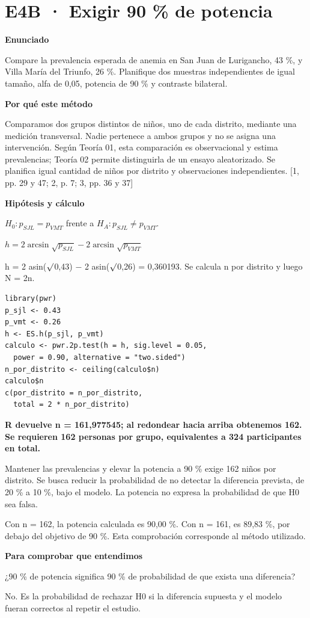 \documentclass[10pt,a4paper]{article}
\newcommand{\etiqueta}[1]{\par{\bfseries\color{Blue}#1}\par}
\newcommand{\cajares}[1]{\par\colorbox{Pale}{\parbox{\dimexpr\linewidth-2\fboxsep}{\vspace{4pt}\textbf{\color{Navy}#1}\vspace{4pt}}}\par}
\begin{document}
\section*{E4B · Exigir 90 \% de potencia}
\etiqueta{Enunciado}
Compare la prevalencia esperada de anemia en San Juan de Lurigancho, 43 \%, y Villa María del Triunfo, 26 \%. Planifique dos muestras independientes de igual tamaño, alfa de 0,05, potencia de 90 \% y contraste bilateral.
\etiqueta{Por qué este método}
Comparamos dos grupos distintos de niños, uno de cada distrito, mediante una medición transversal. Nadie pertenece a ambos grupos y no se asigna una intervención. Según Teoría 01, esta comparación es observacional y estima prevalencias; Teoría 02 permite distinguirla de un ensayo aleatorizado. Se planifica igual cantidad de niños por distrito y observaciones independientes. [1, pp. 29 y 47; 2, p. 7; 3, pp. 36 y 37]
\etiqueta{Hipótesis y cálculo}
$H_0:p_{SJL}=p_{VMT}$ frente a $H_A:p_{SJL}\ne p_{VMT}$.

$h=2\arcsin\sqrt{p_{SJL}}-2\arcsin\sqrt{p_{VMT}}$

h = 2 asin(\ensuremath{\surd}0,43) \ensuremath{-} 2 asin(\ensuremath{\surd}0,26) = 0,360193. Se calcula n por distrito y luego N = 2n.
\begin{Verbatim}
library(pwr)
p_sjl <- 0.43
p_vmt <- 0.26
h <- ES.h(p_sjl, p_vmt)
calculo <- pwr.2p.test(h = h, sig.level = 0.05,
  power = 0.90, alternative = "two.sided")
n_por_distrito <- ceiling(calculo$n)
calculo$n
c(por_distrito = n_por_distrito,
  total = 2 * n_por_distrito)
\end{Verbatim}
\cajares{R devuelve n = 161,977545; al redondear hacia arriba obtenemos 162. Se requieren 162 personas por grupo, equivalentes a 324 participantes en total.}
Mantener las prevalencias y elevar la potencia a 90 \% exige 162 niños por distrito. Se busca reducir la probabilidad de no detectar la diferencia prevista, de 20 \% a 10 \%, bajo el modelo. La potencia no expresa la probabilidad de que H0 sea falsa.

{\small\color{Gray}Con n = 162, la potencia calculada es 90,00 \%. Con n = 161, es 89,83 \%, por debajo del objetivo de 90 \%. Esta comprobación corresponde al método utilizado.}
\etiqueta{Para comprobar que entendimos}
¿90 \% de potencia significa 90 \% de probabilidad de que exista una diferencia?

{\small No. Es la probabilidad de rechazar H0 si la diferencia supuesta y el modelo fueran correctos al repetir el estudio.}
\clearpage
\end{document}
